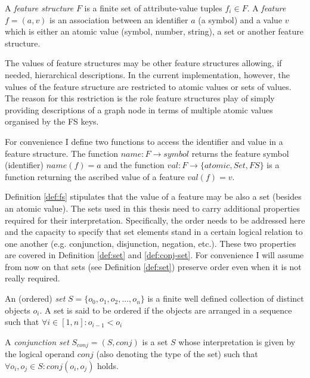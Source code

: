     \begin{definition}\label{def:fs}
    	A \textit{feature structure} $F$ is a finite set of attribute-value tuples $f_{i} \in F$. A \textit{feature} $f=(a,v)$ is an association between an identifier $a$ (a symbol) and a value $v$ which is either an atomic value (symbol, number, string), a set or another feature structure. 
    \end{definition}

    The values of feature structures may be other feature structures allowing, if needed, hierarchical descriptions. In the current implementation, however, the values of the feature structure are restricted to atomic values or sets of values. The reason for this restriction is the role feature structures play of simply providing descriptions of a graph node in terms of multiple atomic values organised by the FS keys. 

    For convenience I define two functions to access the identifier and value in a feature structure. The function $name:F \rightarrow symbol$ returns the feature symbol (identifier) $name(f)=a$ and the function $val:F \rightarrow \{atomic, Set, FS\}$ is a function returning the ascribed value of a feature $val(f)=v$. 

    Definition \ref{def:fs} stipulates that the value of a feature may be also a set (besides an atomic value). The sets used in this thesis need to carry additional properties required for their interpretation. Specifically, the order needs to be addressed here and the capacity to specify that set elements stand in a certain logical relation to one another (e.g. conjunction, disjunction, negation, etc.). These two properties are covered in Definition \ref{def:set} and \ref{def:conj-set}. For convenience I will assume from now on that sets (see Definition \ref{def:set}) preserve order even when it is not really required.  

    \begin{definition}[Set]\label{def:set}
    	An (ordered) \textit{set} $S=\{o_0,o_1,o_2,...,o_n\}$ is a finite well defined collection of distinct objects $o_{i}$. A set is said to be ordered if the objects are arranged in a sequence such that $\forall i \in [1,n]: o_{i-1}<o_{i}$
    \end{definition}

    \begin{definition}\label{def:conj-set}
    	A \textit{conjunction set} $S_{conj}=(S,conj)$ is a set $S$ whose interpretation is given by the logical operand $conj$ (also denoting the type of the set) such that $\forall o_{i},o_{j} \in S: conj(o_{i}, o_{j})$ holds.
    \end{definition}

